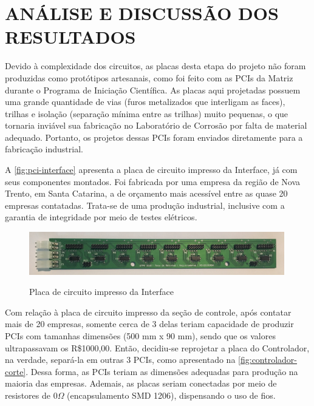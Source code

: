 
\chapter{ANÁLISE E DISCUSSÃO DOS RESULTADOS}
\label{chap:analise-resultados}

Devido à complexidade dos circuitos, as placas desta etapa do projeto não foram produzidas como protótipos artesanais, como foi feito com as PCIs da Matriz durante o Programa de Iniciação Científica. As placas aqui projetadas possuem uma grande quantidade de vias (furos metalizados que interligam as faces), trilhas e isolação (separação mínima entre as trilhas) muito pequenas, o que tornaria inviável sua fabricação no Laboratório de Corrosão por falta de material adequado. Portanto, os projetos dessas PCIs foram enviados diretamente para a fabricação industrial.

A \autoref{fig:pci-interface} apresenta a placa de circuito impresso da Interface, já com seus componentes montados. Foi fabricada por uma empresa da região de Nova Trento, em Santa Catarina, a de orçamento mais acessível entre as quase 20 empresas contatadas. Trata-se de uma produção industrial, inclusive com a garantia de integridade por meio de testes elétricos.

\begin{figure}[H]
    \centering
    \caption{Placa de circuito impresso da Interface}
    \includegraphics[width=0.99\textwidth]{./dados/figuras/pci-interface}
    \label{fig:pci-interface}
\end{figure}

Com relação à placa de circuito impresso da seção de controle, após contatar mais de 20 empresas, somente cerca de 3 delas teriam capacidade de produzir PCIs com tamanhas dimensões (500 mm x 90 mm), sendo que os valores ultrapassavam os R\$1000,00. Então, decidiu-se reprojetar a placa do Controlador, na verdade, separá-la em outras 3 PCIs, como apresentado na \autoref{fig:controlador-corte}. Dessa forma, as PCIs teriam as dimensões adequadas para produção na maioria das empresas. Ademais, as placas seriam conectadas por meio de resistores de $0\Omega$ (encapsulamento SMD 1206), dispensando o uso de fios. 

